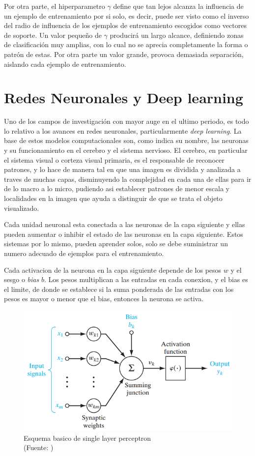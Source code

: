 Por otra parte, el hiperparametro $\gamma$ define que tan lejos alcanza la influencia de un ejemplo de entrenamiento por si solo, es decir, puede ser visto como el inverso del radio de influencia de los ejemplos de entrenamiento escogidos como vectores de soporte. Un valor pequeño de $\gamma$ producirá un largo alcance, definiendo zonas de clasificación muy amplias, con lo cual no se aprecia completamente la forma o patrón de estas. Por otra parte un valor grande, provoca demasiada separación, aislando cada ejemplo de entrenamiento.

\section{Redes Neuronales y Deep learning}

Uno de los campos de investigación con mayor auge en el ultimo periodo, es todo lo relativo a los avances en redes neuronales, particularmente \textit{deep learning}.  La base de estos modelos computacionales son, como indica su nombre, las neuronas y su funcionamiento en el cerebro y el sistema nervioso. El cerebro, en particular el sistema visual o corteza visual primaria, es el responsable de reconocer patrones, y lo hace de manera tal en que una imagen es dividida y analizada a traves de muchas capas, disminuyendo la complejidad en cada una de ellas para ir de lo macro a lo micro, pudiendo asi establecer patrones de menor escala y localidades en la imagen que ayuda a distinguir de que se trata el objeto visualizado.

Cada unidad neuronal esta conectada a las neuronas de la capa siguiente y ellas pueden aumentar o inhibir el estado de las neuronas en la capa siguiente. Estos sistemas por lo mismo, pueden aprender solos, solo se debe suministrar un numero adecuado de ejemplos para el entrenamiento.

Cada activacion de la neurona en la capa siguiente depende de los pesos $w$ y el sesgo o \textit{bias} $b$. Los pesos multiplican a las entradas en cada conexion, y el bias es el limite, de donde se establece si la suma ponderada de las entradas con los pesos es mayor o menor que el bias, entonces la neurona se activa.

\begin{figure}[ht!]
\centering
\includegraphics[width=.6\textwidth]{figures/SLP.png}
\caption[abs]{Esquema basico de single layer perceptron\\
{\scriptsize (Fuente: \cite{slp})}}
\label{fig:slp}
\end{figure}

